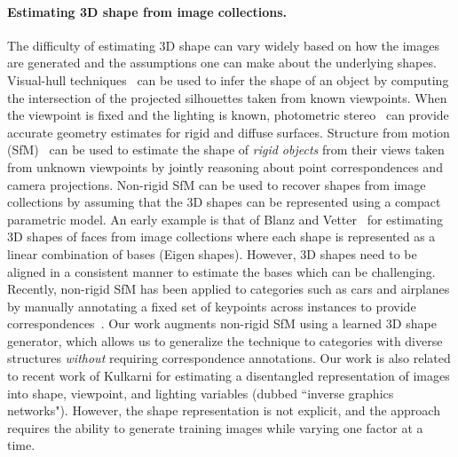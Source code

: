 \paragraph{Estimating 3D shape from image collections.} 
The difficulty of estimating 3D shape can vary widely based on how the
images are generated and the assumptions one can make about the underlying
shapes.
Visual-hull techniques~\cite{laurentini1994visual} can be used to
infer the shape of an object by computing the intersection of the
projected silhouettes taken from known viewpoints. 
When the viewpoint is fixed and the lighting is known, photometric
stereo~\cite{woodham1980photometric} can provide accurate geometry
estimates for rigid and diffuse surfaces.
Structure from motion (SfM)~\cite{hartley2003multiple} can be used to
estimate the shape of \emph{rigid objects} from their views taken from
unknown viewpoints by jointly reasoning about point correspondences
and camera projections. 
Non-rigid SfM can be used to recover shapes from image collections by
assuming that the 3D shapes can be represented using a compact parametric model.
An early example is that of Blanz and Vetter~\cite{blanz1999morphable} for
estimating 3D shapes of faces from image collections where each shape
is represented as a linear combination of bases (Eigen shapes). 
However, 3D shapes need to be aligned in a
consistent manner to estimate the bases which can be challenging.
Recently, non-rigid SfM has been applied to categories such as cars
and airplanes by manually annotating a fixed set of keypoints across
instances to provide correspondences~\cite{kar2015category}.
Our work augments non-rigid SfM using a learned 3D shape generator,
which allows us to generalize the technique to categories with diverse
structures \emph{without} requiring correspondence annotations.
Our work is also related to recent work of Kulkarni
\etal \cite{kulkarni2015deep} for estimating a disentangled
representation of images into shape, viewpoint, and lighting variables
(dubbed ``inverse graphics networks"). However, the shape
representation is not explicit, and the approach requires the ability
to generate training images while varying one factor at a time.

